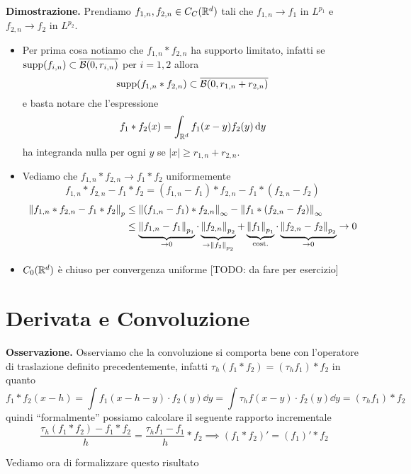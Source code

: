 \documentclass[a4paper, 12pt]{report}
\begin{document}
\textbf{Dimostrazione.}
Prendiamo $f_{1,n}, f_{2, n} \in C_C(\mathbb R^d)$ tali che $f_{1, n} \to f_1$ in $L^{p_1}$ e $f_{2, n} \to f_2$ in $L^{p_2}$.
\begin{itemize}
	\item 
		Per prima cosa notiamo che $f_{1,n} \ast f_{2,n}$ ha supporto limitato, infatti se $\operatorname{supp}(f_{i,n}) \subset \overline{\mathcal B(0, r_{i,n})}$ per $i = 1, 2$ allora
		$$
		\operatorname{supp}(f_{1,n} \ast f_{2,n}) \subset \overline{\mathcal B(0, r_{1,n} + r_{2,n})}
		$$
		e basta notare che l'espressione
		$$
		f_1 \ast f_2(x) = \int_{\mathbb R^d} f_1(x - y) f_2(y) \,\mathrm{d} y
		$$
		ha integranda nulla per ogni $y$ se $|x| \geq r_{1,n} + r_{2,n}$.
	
	\item
		Vediamo che $f_{1,n} \ast f_{2,n} \to f_1 \ast f_2$ uniformemente
		$$
		f_{1,n} \ast f_{2,n} - f_1 \ast f_2 
		= (f_{1,n} - f_1) \ast f_{2,n} - f_1 \ast (f_{2,n} - f_2)
		$$
		$$
		\begin{aligned}
			\left\lVert f_{1,n} \ast f_{2,n} - f_1 \ast f_2 \right\rVert_p
			&\leq \left\lVert (f_{1,n} - f_1) \ast f_{2,n} \right\rVert_\infty - \left\lVert f_1 \ast (f_{2,n} - f_2) \right\rVert_\infty \\
			&\leq 
			\underbrace{\left\lVert f_{1,n} - f_1 \right\rVert_{p_1}}_{\to 0}
			\cdot \underbrace{\left\lVert f_{2,n} \right\rVert_{p_2}}_{\to \left\lVert f_2 \right\rVert_{p_2}}
			+ \underbrace{\left\lVert f_1 \right\rVert_{p_1}}_{\text{cost.}}
			\cdot \underbrace{\left\lVert f_{2,n} - f_2 \right\rVert_{p_2}}_{\to 0}
			\to 0
		\end{aligned}
		$$

	\item 
		$C_0(\mathbb R^d)$ è chiuso per convergenza uniforme [TODO: da fare per esercizio]
\end{itemize}

\section{Derivata e Convoluzione}

\textbf{Osservazione.}
Osserviamo che la convoluzione si comporta bene con l'operatore di traslazione definito precedentemente, infatti $\tau_h (f_1 \ast f_2) = (\tau_h f_1) \ast f_2$ in quanto
$$
f_1 \ast f_2 (x - h) 
= \int f_1(x - h - y) \cdot f_2(y) \dd y = \int \tau_h f(x - y) \cdot f_2(y) \dd y
= (\tau_h f_1) \ast f_2
$$
quindi ``formalmente'' possiamo calcolare il seguente rapporto incrementale
$$
\frac{\tau_h(f_1 \ast f_2) - f_1 \ast f_2}{h}
= \frac{\tau_h f_1 - f_1}{h} \ast f_2
\implies (f_1 \ast f_2)' = (f_1)' \ast f_2
$$

Vediamo ora di formalizzare questo risultato
\end{document}
